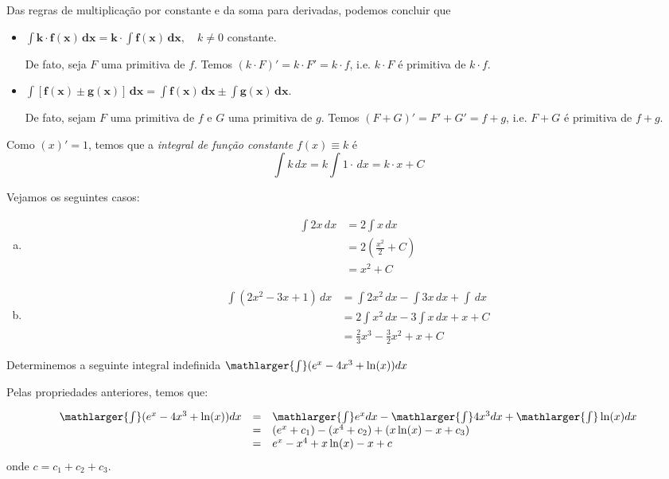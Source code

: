 \cleardoublepage\documentclass[../main.tex]{subfiles}
\begin{document}
Das regras de multiplicação por constante e da soma para derivadas, podemos concluir que
\begin{itemize}
\item $\displaystyle \boldsymbol{\int k\cdot f(x)\,dx = k\cdot \int f(x)\,dx},\quad k\neq 0$ constante.

  De fato, seja $F$ uma primitiva de $f$. Temos $(k\cdot F)' = k\cdot F' = k\cdot f$, i.e. $k\cdot F$ é primitiva de $k\cdot f$.
  
\item $\displaystyle \boldsymbol{\int \left[f(x)\pm g(x)\right]\,dx = \int f(x)\,dx \pm \int g(x)\,dx}$.

  De fato, sejam $F$ uma primitiva de $f$ e $G$ uma primitiva de $g$. Temos $(F + G)' = F' + G' = f + g$, i.e. $F + G$ é primitiva de $f+g$.
\end{itemize}

\begin{obs}
  Como $(x)' = 1$, temos que a \emph{integral de função constante} $f(x)\equiv k$ é
  \begin{equation*}
    \int k\,dx = k\int 1\cdot\,dx = k\cdot x + C
  \end{equation*}
\end{obs}

\begin{ex}
  Vejamos os seguintes casos:
  \begin{enumerate}[a)]
  \item
    \begin{align*}
      \int 2x\,dx &= 2\int x\,dx \\
                  &= 2 \left(\frac{x^2}{2} + C\right) \\
                  &= x^2 + C
    \end{align*}
  \item
    \begin{align*}
      \int (2x^2 - 3x + 1)\,dx &= \int 2x^2\,dx - \int 3x\,dx + \int \,dx \\
                               &= 2\int x^2\,dx - 3\int x\,dx + x + C \\
                               &= \frac{2}{3}x^3 - \frac{3}{2}x^2 + x + C
    \end{align*}
  \end{enumerate}
\end{ex}


\begin{ex}
Determinemos a seguinte integral indefinida \(\mathlarger{\int} (e^x-4x^3+\ln (x))dx\)

\begin{solution}
Pelas propriedades anteriores, temos que:

\[ \begin{array}{rcl} \mathlarger{\int} (e^x-4x^3+\ln (x))dx &=&\mathlarger{\int} e^xdx -\mathlarger{\int} 4x^3dx + \mathlarger{\int} \ln (x) dx\\ &=&(e^x+c_1)-(x^4+c_2)+(x\ln (x) - x+c_3)\\ &=& e^x-x^4+x\ln (x) - x+c \end{array} \]
onde \(c=c_1+c_2+c_3\).
\end{solution}
\end{ex}
\end{document}
